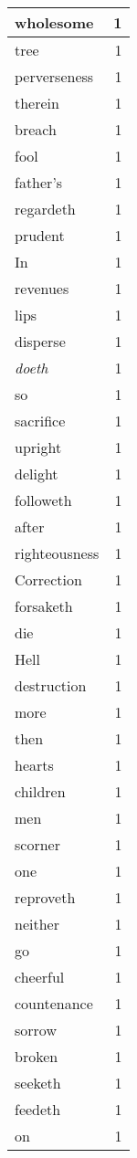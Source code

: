 \begin{center}
\begin{longtable}{l|r}
wholesome & 1\\ \hline 
tree & 1\\ \hline 
perverseness & 1\\ \hline 
therein & 1\\ \hline 
breach & 1\\ \hline 
fool & 1\\ \hline 
father's & 1\\ \hline 
regardeth & 1\\ \hline 
prudent & 1\\ \hline 
In & 1\\ \hline 
revenues & 1\\ \hline 
lips & 1\\ \hline 
disperse & 1\\ \hline 
\emph{doeth} & 1\\ \hline 
so & 1\\ \hline 
sacrifice & 1\\ \hline 
upright & 1\\ \hline 
delight & 1\\ \hline 
followeth & 1\\ \hline 
after & 1\\ \hline 
righteousness & 1\\ \hline 
Correction & 1\\ \hline 
forsaketh & 1\\ \hline 
die & 1\\ \hline 
Hell & 1\\ \hline 
destruction & 1\\ \hline 
more & 1\\ \hline 
then & 1\\ \hline 
hearts & 1\\ \hline 
children & 1\\ \hline 
men & 1\\ \hline 
scorner & 1\\ \hline 
one & 1\\ \hline 
reproveth & 1\\ \hline 
neither & 1\\ \hline 
go & 1\\ \hline 
cheerful & 1\\ \hline 
countenance & 1\\ \hline 
sorrow & 1\\ \hline 
broken & 1\\ \hline 
seeketh & 1\\ \hline 
feedeth & 1\\ \hline 
on & 1\\ \hline 

\end{longtable}
\end{center}
